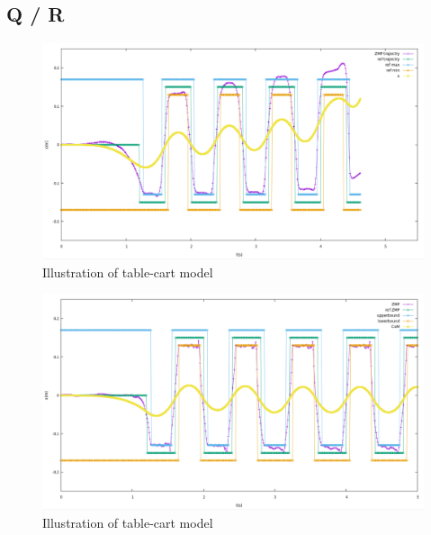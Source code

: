 \subsection{Q / R}
\begin{figure}[H]
  \centering
 \includegraphics[keepaspectratio, scale=0.25]
      {images/mpc_qr/mpc_qr_10_4_error.png}
 \caption{Illustration of table-cart model}
 \label{Fig:Illustration of table-cart model}
\end{figure}

\begin{figure}[H]
  \centering
 \includegraphics[keepaspectratio, scale=0.25]
      {images/mpc_qr/mpc_qr_10_5.png}
 \caption{Illustration of table-cart model}
 \label{Fig:Illustration of table-cart model}
\end{figure}

